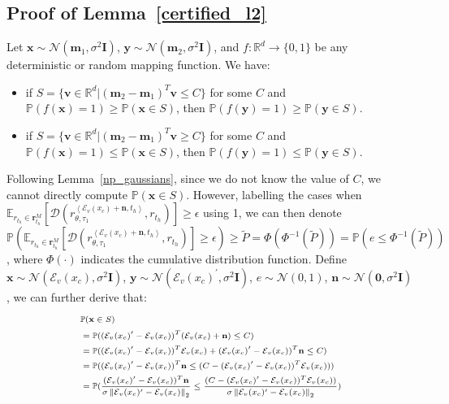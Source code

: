 \newpage
\subsection{Proof of Lemma~\ref{certified_l2}}
\label{proof-lemma-1}
\begin{lemma}
\label{np_gaussians}
Let $\mathbf{x}\sim\mathcal{N}(\mathbf{m}_1, \sigma^2\mathbf{I})$, $\mathbf{y}\sim\mathcal{N}(\mathbf{m}_2, \sigma^2\mathbf{I})$, and $f:\mathbb{R}^d\rightarrow\{0, 1\}$ be any deterministic or random mapping function. We have:
\begin{itemize}
\item if $S = \{\mathbf{v}\in\mathbb{R}^d | (\mathbf{m}_2 - \mathbf{m}_1)^T\mathbf{v}\leq C\}$ for some $C$ and $\mathbb{P}(f(\mathbf{x})=1)\geq\mathbb{P}(\mathbf{x}\in S)$, then $\mathbb{P}(f(\mathbf{y})=1)\geq\mathbb{P}(\mathbf{y}\in S)$. 
\item if $S = \{\mathbf{v}\in\mathbb{R}^d | (\mathbf{m}_2 - \mathbf{m}_1)^T\mathbf{v}\geq C\}$ for some $C$ and $\mathbb{P}(f(\mathbf{x})=1)\leq\mathbb{P}(\mathbf{x}\in S)$, then $\mathbb{P}(f(\mathbf{y})=1)\leq\mathbb{P}(\mathbf{y}\in S)$.
\end{itemize}
\end{lemma}
Following Lemma~\ref{np_gaussians}, since we do not know the value of $C$, we cannot directly compute $\mathbb{P}(\mathbf{x}\in S)$. However, labelling the cases when $\mathbb{E}_{r_{t_h}\in\mathbf{r}_{t_h}^M}[\mathcal{D}(r_{\theta, \tau_1}^{\left<\mathcal{E}_v(x_c)+\mathbf{n}, t_h\right>}, r_{t_h})]\geq\epsilon$ using 1, we can then denote $\mathbb{P}(\mathbb{E}_{r_{t_h}\in\mathbf{r}_{t_h}^M}[\mathcal{D}(r_{\theta, \tau_1}^{\left<\mathcal{E}_v(x_c)+\mathbf{n}, t_h\right>}, r_{t_h})]\geq\epsilon)\geq\tilde{P}= \Phi(\Phi^{-1}(\tilde{P}))= \mathbb{P}(e\leq\Phi^{-1}(\tilde{P}))$, where $\Phi(\cdot)$ indicates the cumulative distribution function. Define $\mathbf{x}\sim\mathcal{N}(\mathcal{E}_v(x_c), \sigma^2\mathbf{I})$, $\mathbf{y}\sim\mathcal{N}(\mathcal{E}_v(x_c)^{\prime}, \sigma^2\mathbf{I})$, $e\sim\mathcal{N}(0, 1)$, $\mathbf{n}\sim\mathcal{N}(\mathbf{0}, \sigma^2\mathbf{I})$, we can further derive that:
\begin{align}
\scriptsize
\begin{split}
&\mathbb{P}(\mathbf{x}\in S)\\
&= \mathbb{P}((\mathcal{E}_v(x_c)^{\prime} - \mathcal{E}_v(x_c))^T(\mathcal{E}_v(x_c)+\mathbf{n})\leq C) \\
&=\mathbb{P}((\mathcal{E}_v(x_c)^{\prime} - \mathcal{E}_v(x_c))^T\mathcal{E}_v(x_c)+(\mathcal{E}_v(x_c)^{\prime} - \mathcal{E}_v(x_c))^T\mathbf{n}\leq C)\\
&=\mathbb{P}((\mathcal{E}_v(x_c)^{\prime} - \mathcal{E}_v(x_c))^T\mathbf{n}\leq (C - (\mathcal{E}_v(x_c)^{\prime} - \mathcal{E}_v(x_c))^T\mathcal{E}_v(x_c)))\\
&=\mathbb{P}(\frac{(\mathcal{E}_v(x_c)^{\prime} - \mathcal{E}_v(x_c))^T\mathbf{n}}{\sigma\left\|\mathcal{E}_v(x_c)^{\prime} - \mathcal{E}_v(x_c)\right\|_2}\leq \frac{(C - (\mathcal{E}_v(x_c)^{\prime} - \mathcal{E}_v(x_c))^T\mathcal{E}_v(x_c))}{\sigma\left\|\mathcal{E}_v(x_c)^{\prime} - \mathcal{E}_v(x_c)\right\|_2})
\end{split}
\end{align}
